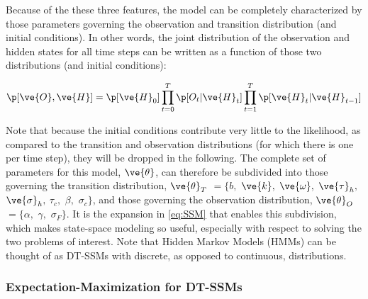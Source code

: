 Because of the these three features, the model can be completely characterized by those parameters governing the observation and transition distribution (and initial conditions).  In other words, the joint distribution of the observation and hidden states for all time steps can be written as a function of those two distributions (and initial conditions):

\begin{align}\label{eq:SSM}
\p[\ve{O}, \ve{H}] = \p[\ve{H}_0] \prod_{t=0}^T \p[O_t | \ve{H}_t]
\prod_{t=1}^T \p[\ve{H}_t | \ve{H}_{t-1}]
\end{align}

\noindent Note that because the initial conditions contribute very little to the likelihood, as compared to the transition and observation distributions (for which there is one per time step), they will be dropped in the following.  The complete set of parameters for this model, $\ve{\theta}$, can therefore be subdivided into those governing the transition distribution, $\ve{\theta}_T$ $=\{b,$ $\ve{k},$ $\ve{\omega},$ $\ve{\tau}_h,$ $ \ve{\sigma}_h,$ $\tau_c,$ $\beta,$ $\sigma_c\}$, and those governing the observation distribution, $\ve{\theta}_O$ $=\{\alpha,$ $\gamma, $ $\sigma_F\}$.  It is the expansion in \eqref{eq:SSM} that enables this subdivision, which makes state-space modeling so useful, especially with respect to solving the two problems of interest.  Note that Hidden Markov Models (HMMs) can be thought of as DT-SSMs with discrete, as opposed to continuous, distributions.

\subsubsection{Expectation-Maximization for DT-SSMs}

